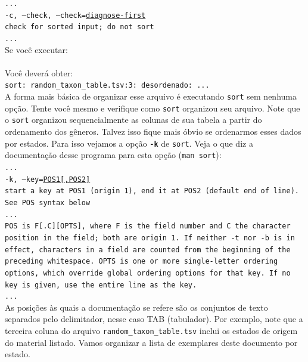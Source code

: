 \begin{refsection}
\noindent\texttt{...}\\
\texttt{-c, --check, --check=\underline{diagnose-first}}\\
\indent\indent\texttt{check for sorted input; do not sort}\\
\texttt{...}\\

Se você executar:\\
\\

Você deverá obter:\\
\texttt{sort: random\_taxon\_table.tsv:3: desordenado: ...}\\

A forma mais básica de organizar esse arquivo é executando \texttt{sort} sem nenhuma opção. Tente você mesmo e verifique como \texttt{sort} organizou seu arquivo. Note que o \texttt{sort} organizou sequencialmente as colunas de sua tabela a partir do ordenamento dos gêneros. Talvez isso fique mais óbvio se ordenarmos esses dados por estados. Para isso vejamos a opção \texttt{\textbf{-k}} de \texttt{sort}. Veja o que diz a documentação desse programa para esta opção (\texttt{man sort}):\\

\noindent\texttt{...}\\
\texttt{-k, --key=\underline{POS1[,POS2]}}\\
\indent\texttt{start a key at POS1 (origin 1), end it at POS2 (default end of line).  See POS syntax below}\\
\texttt{...}\\
\texttt{POS  is  F[.C][OPTS],  where  F  is the field number and C the character position in the field; both are origin 1.  If neither -t nor -b is in effect, characters in a field are counted from the beginning of the preceding whitespace.  OPTS is one or more single-letter ordering options, which override global ordering options for that key.  If no key is given, use the entire line as the key.}\\
\texttt{...}\\

As posições às quais a documentação se refere são os conjuntos de texto separados pelo delimitador, nesse caso \textsc{TAB} (tabulador). Por exemplo, note que a terceira coluna do arquivo \texttt{random\_taxon\_table.tsv} inclui os estados de origem do material listado. Vamos organizar a lista de exemplares deste documento por estado.\\


\end{refsection}
